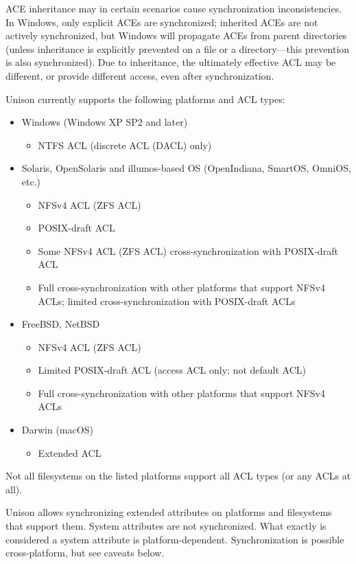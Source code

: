 \documentclass{article}
\begin{document}
ACE inheritance may in certain scenarios cause synchronization inconsistencies.
In Windows, only explicit ACEs are synchronized; inherited ACEs are not
actively synchronized, but Windows will propagate ACEs from parent directories
(unless inheritance is explicitly prevented on a file or a directory---this
prevention is also synchronized). Due to inheritance, the ultimately effective
ACL may be different, or provide different access, even after synchronization.

Unison currently supports the following platforms and ACL types:
\begin{itemize}
  \item Windows (Windows XP SP2 and later)
  \begin{itemize}
    \item NTFS ACL (discrete ACL (DACL) only)
  \end{itemize}
\item Solaris, OpenSolaris and illumos-based OS (OpenIndiana, SmartOS,
  OmniOS, etc.)
  \begin{itemize}
  \item NFSv4 ACL (ZFS ACL)
  \item POSIX-draft ACL
  \item Some NFSv4 ACL (ZFS ACL) cross-synchronization with
  POSIX-draft ACL
  \item Full cross-synchronization with other platforms that support
  NFSv4 ACLs; limited cross-synchronization with POSIX-draft ACLs
  \end{itemize}
\item FreeBSD, NetBSD
  \begin{itemize}
  \item NFSv4 ACL (ZFS ACL)
  \item Limited POSIX-draft ACL (access ACL only; not default ACL)
  \item Full cross-synchronization with other platforms that support
  NFSv4 ACLs
  \end{itemize}
\item Darwin (macOS)
  \begin{itemize}
  \item Extended ACL
  \end{itemize}
\end{itemize}
Not all filesystems on the listed platforms support all ACL types
(or any ACLs at all).


Unison allows synchronizing extended attributes on platforms and
filesystems that support them. System attributes are not synchronized.
What exactly is considered a system attribute is platform-dependent.
Synchronization is possible cross-platform, but see caveats below.
\end{document}
